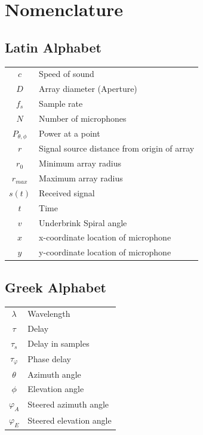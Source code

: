 \documentclass{UoNMCHA}
\numberwithin{equation}{section}
\begin{document}
\section*{Nomenclature}
\subsection*{Latin Alphabet}
    \begin{table}[H]
        \begin{tabular}{cl}
            $c$&Speed of sound\\
            $D$&Array diameter (Aperture)\\
            $f_s$&Sample rate\\
            $N$&Number of microphones\\
            $P_{\theta,\phi}$&Power at a point\\
            $r$&Signal source distance from origin of array\\
            $r_0$&Minimum array radius\\
            $r_{max}$&Maximum array radius\\
            $s(t)$&Received signal\\
            $t$&Time\\
            $v$&Underbrink Spiral angle\\
            $x$&x-coordinate location of microphone\\
            $y$&y-coordinate location of microphone
        \end{tabular}
    \end{table}

    \subsection*{Greek Alphabet}
    \begin{table}[H]
        \begin{tabular}{cl}
            $\lambda$&Wavelength\\
            $\tau$&Delay\\
            $\tau_s$&Delay in samples\\
            $\tau_\varphi$&Phase delay\\
            $\theta$&Azimuth angle\\
            $\phi$&Elevation angle\\
            $\varphi_A$&Steered azimuth angle\\
            $\varphi_E$&Steered elevation angle
        \end{tabular}
    \end{table}
\newpage
\onehalfspacing
\end{document}
